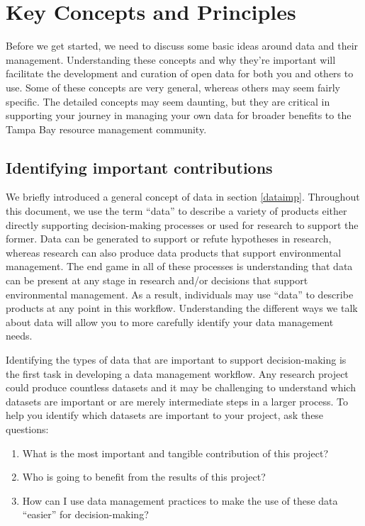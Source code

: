 \documentclass[
]{book}
\providecommand{\tightlist}{%
  \setlength{\itemsep}{0pt}\setlength{\parskip}{0pt}}
\begin{document}
\hypertarget{keys}{%
\chapter{Key Concepts and Principles}\label{keys}}

Before we get started, we need to discuss some basic ideas around data and their management. Understanding these concepts and why they're important will facilitate the development and curation of open data for both you and others to use. Some of these concepts are very general, whereas others may seem fairly specific. The detailed concepts may seem daunting, but they are critical in supporting your journey in managing your own data for broader benefits to the Tampa Bay resource management community.

\hypertarget{contribs}{%
\section{Identifying important contributions}\label{contribs}}

We briefly introduced a general concept of data in section \ref{dataimp}. Throughout this document, we use the term ``data'' to describe a variety of products either directly supporting decision-making processes or used for research to support the former. Data can be generated to support or refute hypotheses in research, whereas research can also produce data products that support environmental management. The end game in all of these processes is understanding that data can be present at any stage in research and/or decisions that support environmental management. As a result, individuals may use ``data'' to describe products at any point in this workflow. Understanding the different ways we talk about data will allow you to more carefully identify your data management needs.

Identifying the types of data that are important to support decision-making is the first task in developing a data management workflow. Any research project could produce countless datasets and it may be challenging to understand which datasets are important or are merely intermediate steps in a larger process. To help you identify which datasets are important to your project, ask these questions:

\begin{enumerate}
\def\labelenumi{\arabic{enumi}.}
\tightlist
\item
  What is the most important and tangible contribution of this project?\\
\item
  Who is going to benefit from the results of this project?
\item
  How can I use data management practices to make the use of these data ``easier'' for decision-making?
\end{enumerate}
\end{document}
